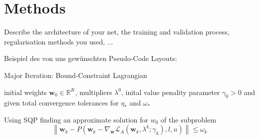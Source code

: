 \section{Methods}

Describe the architecture of your net, the training and validation process, regularisation methods you used, ...

Beispiel des von uns gewünschten Pseudo-Code Layouts:

\begin{algorithm}[H]
\caption{Major Iteration: Bound-Constraint Lagrangian}
\begin{algorithmic} 
\REQUIRE initial weights $ \boldsymbol w_{0} \in \mathbb{R}^{K} $, multipliers $\lambda^{0} $, inital value penality parameter $\gamma_{0}>0$ and given total convergence tolerances for $\eta_{*}$ and $\omega_{*}$ 

    \STATE Using SQP finding an approximate solution for $w_{0}$ of the subproblem
        \begin{equation*}
          \left\| \boldsymbol w_{k}-P\left( \boldsymbol w_{k}-\nabla_{ \boldsymbol w} \mathcal{L}_{A}\left( \boldsymbol w_{k}, \lambda^{k} ; \gamma_{k}\right), l, u\right)\right\| \leq \omega_{k}
        \end{equation*}


            
        
        \ELSE
    
    \ENDIF


\ENDFOR

\end{algorithmic}
\end{algorithm}
